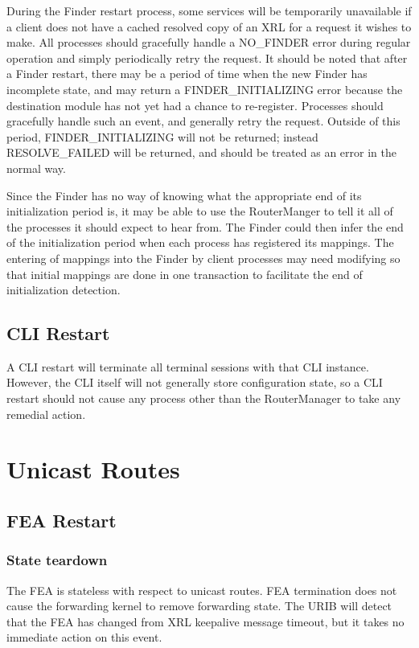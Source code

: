 \documentclass[11pt]{article}
\begin{document}
During the Finder restart process, some services will be temporarily
unavailable if a client does not have a cached resolved copy of an XRL
for a request it wishes to make.  All processes should gracefully
handle a NO\_FINDER error during regular operation and simply
periodically retry the request.  It should be noted that after a
Finder restart, there may be a period of time when the new Finder has
incomplete state, and may return a FINDER\_INITIALIZING error because
the destination module has not yet had a chance to re-register.
Processes should gracefully handle such an event, and generally retry the
request.  Outside of this period, FINDER\_INITIALIZING will not be
returned; instead RESOLVE\_FAILED will be returned, and should be
treated as an error in the normal way.

Since the Finder has no way of knowing what the appropriate end of
its initialization period is, it may be able to use the RouterManger
to tell it all of the processes it should expect to hear from.  The
Finder could then infer the end of the initialization period when each
process has registered its mappings.  The entering of mappings into
the Finder by client processes may need modifying so that initial
mappings are done in one transaction to facilitate the end of
initialization detection.

\subsection{CLI Restart}
A CLI restart will terminate all terminal sessions with that CLI
instance.  However, the CLI itself will not generally store
configuration state, so a CLI restart should not cause any process
other than the RouterManager to take any remedial action.

\section{Unicast Routes}

\subsection{FEA Restart}
\subsubsection*{State teardown}
The FEA is stateless with respect to unicast routes.  FEA termination
does not cause the forwarding kernel to remove forwarding state.  The
URIB will detect that the FEA has changed from XRL keepalive message
timeout, but it takes no immediate action on this event.
\end{document}
